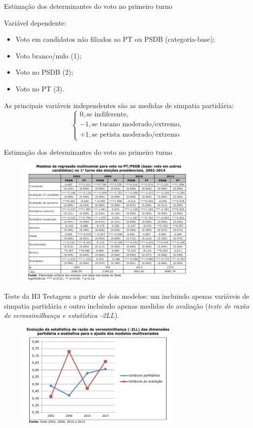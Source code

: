 \documentclass[9pt]{beamer}
\begin{document}
\begin{frame}{Estimação dos determinantes do voto no primeiro turno}

Variável dependente:

\begin{itemize}
    \item Voto em candidatos não filiados ao PT ou PSDB (categoria-base);
    \item Voto branco/nulo (1);
    \item Voto no PSDB (2);
    \item Voto no PT (3).
\end{itemize}

As principais variáveis independentes são as medidas de simpatia partidária: $$\begin{cases}
    0, \text{se indiferente,} \\
    -1, \text{se tucano moderado/extremo,} \\
    +1, \text{se petista moderado/extremo}
\end{cases}$$

\end{frame}

\begin{frame}{Estimação dos determinantes do voto no primeiro turno}
    \begin{figure}[h]
        \includegraphics[width=9cm]{images/regressao1.png}
    \end{figure}
\end{frame}

\begin{frame}{Teste da H3}
    Testagem a partir de dois modelos: um incluindo apenas variáveis de simpatia partidária e outro incluindo apenas medidas de avaliação (\textit{teste de razão de verossimilhança e estatística -2LL}).
    \begin{figure}[h]
        \includegraphics[width=8cm]{images/2ll.png}
    \end{figure}
\end{frame}
\end{document}
